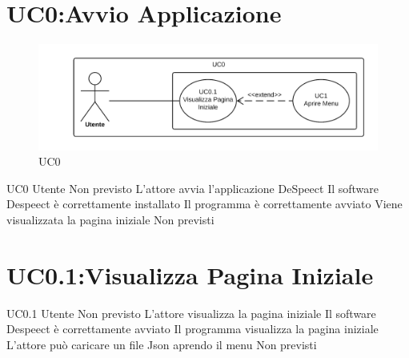 \documentclass[../AnalisideiRequisiti.tex]{subfiles}
\begin{document}
	\section{UC0:Avvio Applicazione}
	\begin{figure}[H]
		\caption{UC0}
		\centering
		\includegraphics[width=\textwidth]{../img/UC00.png}
	\end{figure}
	\UserCase
	{UC0}
	{Utente}
	{Non previsto}
	{L'attore avvia l'applicazione DeSpeect}
	{Il software Despeect è correttamente installato}
	{Il programma è correttamente avviato}
	{Viene visualizzata la pagina iniziale }
	{Non previsti}
	
	\section{UC0.1:Visualizza Pagina Iniziale}
	\UserCase
	{UC0.1}
	{Utente}
	{Non previsto}
	{L'attore visualizza la pagina iniziale}
	{Il software Despeect è correttamente avviato }
	{Il programma visualizza la pagina iniziale}
	{L'attore può caricare un file Json aprendo il menu }
	{Non previsti}
	
\end{document}
